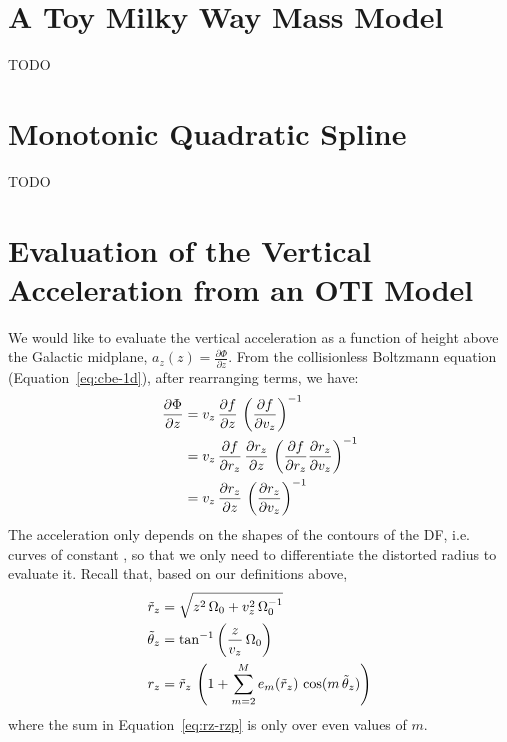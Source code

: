 
\appendix

\section{A Toy Milky Way Mass Model}
\label{sec:appendix-potential}

TODO


\section{Monotonic Quadratic Spline}
\label{sec:appendix-spline}

TODO

\section{Evaluation of the Vertical Acceleration from an OTI Model}
\label{sec:appendix-az}

We would like to evaluate the vertical acceleration as a function of height above the
Galactic midplane, $a_z(z) = \frac{\partial \Phi}{\partial z}$.
From the collisionless Boltzmann equation (Equation~\ref{eq:cbe-1d}), after rearranging
terms, we have:
\begin{align}
    \frac{\partial \Phi}{\partial z} &=
        v_z \, \frac{\partial f}{\partial z} \,
        \left( \frac{\partial f}{\partial v_z} \right)^{-1} \\
    &= v_z \, \frac{\partial f}{\partial r_z} \, \frac{\partial r_z}{\partial z} \,
        \left( \frac{\partial f}{\partial r_z} \frac{\partial r_z}{\partial v_z} \right)^{-1} \\
        &= v_z \, \frac{\partial r_z}{\partial z} \,
        \left( \frac{\partial r_z}{\partial v_z} \right)^{-1}
\end{align}
The acceleration only depends on the shapes of the contours of the DF, i.e. curves of
constant \rz, so that we only need to differentiate the distorted radius to evaluate it.
Recall that, based on our definitions above,
\begin{align}
    \tilde{r}_z &= \sqrt{z^2 \, \Omega_0 + v_z^2 \, \Omega_0^{-1}} \\
    \tilde{\theta}_z &= \tan^{-1}\left(\frac{z}{v_z} \, \Omega_0\right) \\
    r_z &= \tilde{r}_z \, \left( 1 + \sum_{m=2}^{M} e_m(\tilde{r}_z) \,
        \cos(m \, \tilde{\theta}_z) \right) \label{eq:rz-rzp}
\end{align}
where the sum in Equation~\ref{eq:rz-rzp} is only over even values of $m$.

